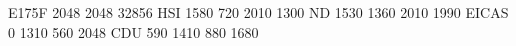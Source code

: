 E175F 2048 2048 32856
HSI      1580  720 2010 1300
ND       1530 1360 2010 1990
EICAS       0 1310  560 2048
CDU       590 1410  880 1680
